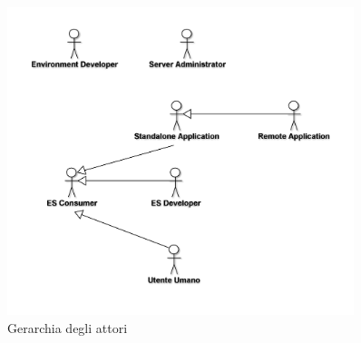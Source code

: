 \begin{figure}[h]
\centering
\includegraphics[width=0.9\textwidth]{Immagini/Capitolo2/UseCases/Attori.png}
\caption{Gerarchia degli attori}\label{fig:attori}
\end{figure}

